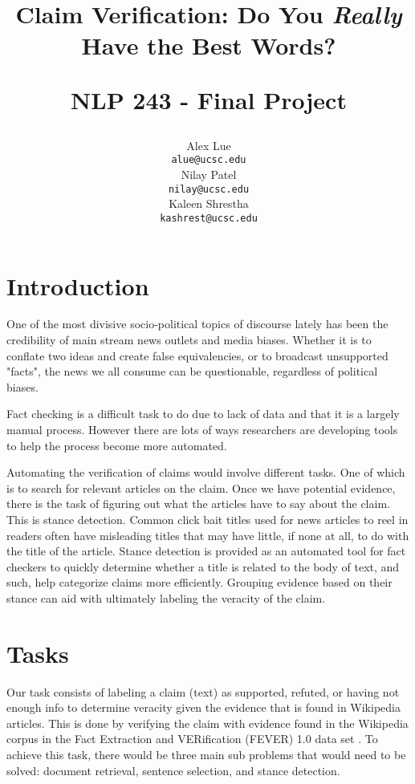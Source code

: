 \documentclass[11pt,a4paper]{article}
\title{Claim Verification: Do You \textit{Really} Have the Best Words?



  NLP 243 - Final Project}
\author{Alex Lue \\
  \texttt{alue@ucsc.edu} \\\And
  Nilay Patel \\
  \texttt{nilay@ucsc.edu} \\\And
  Kaleen Shrestha \\
  \texttt{kashrest@ucsc.edu}\\}
\date{}
\begin{document}
\maketitle
\section{Introduction}
One of the most divisive socio-political topics of discourse lately has been the credibility of main stream news outlets and media biases. Whether it is to conflate two ideas and create false equivalencies, or to broadcast unsupported "facts", the news we all consume can be questionable, regardless of political biases.

Fact checking is a difficult task to do due to lack of data and that it is a largely manual process. However there are lots of ways researchers are developing tools to help the process become more automated.

Automating the verification of claims would involve different tasks. One of which is to search for relevant articles on the claim. Once we have potential evidence, there is the task of figuring out what the articles have to say about the claim. This is stance detection. Common click bait titles used for news articles to reel in readers often have misleading titles that may have little, if none at all, to do with the title of the article. Stance detection is provided as an automated tool for fact checkers to quickly determine whether a title is related to the body of text, and such, help categorize claims more efficiently. Grouping evidence based on their stance can aid with ultimately labeling the veracity of the claim.

\section{Tasks}
Our task consists of labeling a claim (text) as supported, refuted, or having not enough info to determine veracity given the evidence that is found in Wikipedia articles. This is done by verifying the claim with evidence found in the Wikipedia corpus in the Fact Extraction and VERification (FEVER) 1.0 data set \cite{fever2018}. To achieve this task, there would be three main sub problems that would need to be solved: document retrieval, sentence selection, and stance detection.
\end{document}
